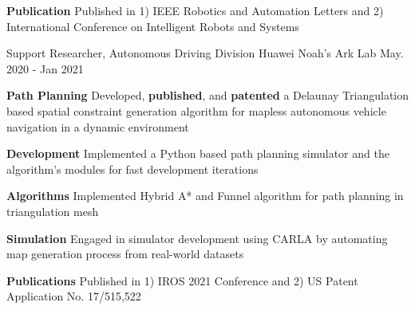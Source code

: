 \begin{cventries}
{\begin{cvitems}
{			}
			\item {
				\textbf{Publication} Published in 1) IEEE Robotics and Automation Letters and 2) International Conference on Intelligent Robots and Systems
			}
		\end{cvitems}
	}
	\cventry
	{Support Researcher, Autonomous Driving Division}
	{Huawei Noah’s Ark Lab}
	{May. 2020 - Jan 2021}
	{}
	{
		\begin{cvitems}
			\item {
				\textbf{Path Planning} Developed, \textbf{published}, and \textbf{patented} a Delaunay Triangulation based spatial constraint generation algorithm for mapless autonomous vehicle navigation in a dynamic environment
			}
			\item {
				\textbf{Development} Implemented a Python based path planning simulator and the algorithm's modules for fast development iterations
			}
			\item {
				\textbf{Algorithms} Implemented Hybrid A* and Funnel algorithm for path planning in triangulation mesh
			}
			\item {
				\textbf{Simulation} Engaged in simulator development using CARLA by automating map generation process from real-world datasets
			}
			\item{
				\textbf{Publications} Published in 1) IROS 2021 Conference and 2) US Patent Application No. 17/515,522
			}
		\end{cvitems}
	}
\end{cventries}

